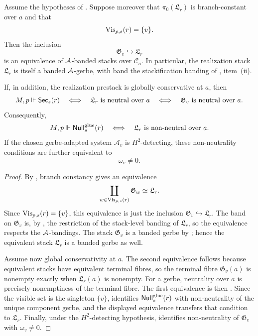 \begin{theorem}\label{thm:unique-branch-banded-gerbe}
Assume the hypotheses of . Suppose moreover
that $\pi_0(\mathfrak L_r)$ is branch-constant over $a$ and that
\[
\mathrm{Vis}_{p,s}(r)=\{v\}.
\]
Then the inclusion
\[
\mathfrak G_v\hookrightarrow \mathfrak L_r
\]
is an equivalence of $\mathcal{A}$-banded stacks over $\mathcal C_a$. In particular,
the realization stack $\mathfrak L_r$ is itself a banded $\mathcal{A}$-gerbe, with
band the stackification banding of ,
item~\textup{(ii)}.

If, in addition, the realization prestack is globally conservative at $a$, then
\[
M,p\Vdash \mathsf{Sec}_s(r)
\quad\Longleftrightarrow\quad
\mathfrak L_r\ \text{is neutral over }a
\quad\Longleftrightarrow\quad
\mathfrak G_v\ \text{is neutral over }a.
\]
Consequently,
\[
M,p\Vdash \mathsf{Null}^{\mathrm{glue}}_s(r)
\quad\Longleftrightarrow\quad
\mathfrak L_r\ \text{is non-neutral over }a.
\]
If the chosen gerbe-adapted system $\mathcal A_v$ is $H^2$-detecting, these
non-neutrality conditions are further equivalent to
\[
\omega_v\neq 0.
\]
\end{theorem}

\begin{proof}
By , branch constancy gives an equivalence
\[
\coprod_{w\in\mathrm{Vis}_{p,s}(r)}\mathfrak G_w\simeq \mathfrak L_r.
\]
Since $\mathrm{Vis}_{p,s}(r)=\{v\}$, this equivalence is just the inclusion
$\mathfrak G_v\hookrightarrow\mathfrak L_r$. The band on $\mathfrak G_v$ is, by
, the restriction of the
stack-level banding of $\mathfrak L_r$, so the equivalence respects the
$\mathcal{A}$-bandings. The stack $\mathfrak G_v$ is a banded gerbe by
; hence the equivalent stack
$\mathfrak L_r$ is a banded gerbe as well.

Assume now global conservativity at $a$. The second equivalence follows because
equivalent stacks have equivalent terminal fibres, so the terminal fibre
$\mathfrak G_v(a)$ is nonempty exactly when $\mathfrak L_r(a)$ is nonempty.
For a gerbe, neutrality over $a$ is precisely nonemptiness of the terminal
fibre. The first equivalence is then . Since
the visible set is the singleton $\{v\}$,  identifies
$\mathsf{Null}^{\mathrm{glue}}_s(r)$ with non-neutrality of the unique component gerbe,
and the displayed equivalence transfers that condition to $\mathfrak L_r$.
Finally, under the $H^2$-detecting hypothesis,
 identifies non-neutrality of
$\mathfrak G_v$ with $\omega_v\neq 0$.
\end{proof}


